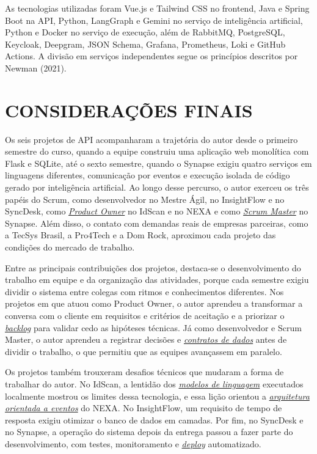 \documentclass[12pt,a4paper]{article}
\newcommand{\termo}[2]{\hyperlink{gls:#1}{\textit{#2}}}
\begin{document}
As tecnologias utilizadas foram Vue.js e Tailwind CSS no frontend, Java e Spring Boot na API, Python, LangGraph e Gemini no serviço de inteligência artificial, Python e Docker no serviço de execução, além de RabbitMQ, PostgreSQL, Keycloak, Deepgram, JSON Schema, Grafana, Prometheus, Loki e GitHub Actions. A divisão em serviços independentes segue os princípios descritos por Newman (2021).

\clearpage
\section{CONSIDERAÇÕES FINAIS}

Os seis projetos de API acompanharam a trajetória do autor desde o primeiro semestre do curso, quando a equipe construiu uma aplicação web monolítica com Flask e SQLite, até o sexto semestre, quando o Synapse exigiu quatro serviços em linguagens diferentes, comunicação por eventos e execução isolada de código gerado por inteligência artificial. Ao longo desse percurso, o autor exerceu os três papéis do Scrum, como desenvolvedor no Mestre Ágil, no InsightFlow e no SyncDesk, como \termo{po}{Product Owner} no IdScan e no NEXA e como \termo{sm}{Scrum Master} no Synapse. Além disso, o contato com demandas reais de empresas parceiras, como a TecSys Brasil, a Pro4Tech e a Dom Rock, aproximou cada projeto das condições do mercado de trabalho.

Entre as principais contribuições dos projetos, destaca-se o desenvolvimento do trabalho em equipe e da organização das atividades, porque cada semestre exigiu dividir o sistema entre colegas com ritmos e conhecimentos diferentes. Nos projetos em que atuou como Product Owner, o autor aprendeu a transformar a conversa com o cliente em requisitos e critérios de aceitação e a priorizar o \termo{backlog}{backlog} para validar cedo as hipóteses técnicas. Já como desenvolvedor e Scrum Master, o autor aprendeu a registrar decisões e \termo{contrato}{contratos de dados} antes de dividir o trabalho, o que permitiu que as equipes avançassem em paralelo.

Os projetos também trouxeram desafios técnicos que mudaram a forma de trabalhar do autor. No IdScan, a lentidão dos \termo{modelo}{modelos de linguagem} executados localmente mostrou os limites dessa tecnologia, e essa lição orientou a \termo{eventos}{arquitetura orientada a eventos} do NEXA. No InsightFlow, um requisito de tempo de resposta exigiu otimizar o banco de dados em camadas. Por fim, no SyncDesk e no Synapse, a operação do sistema depois da entrega passou a fazer parte do desenvolvimento, com testes, monitoramento e \termo{deploy}{deploy} automatizado.
\end{document}

